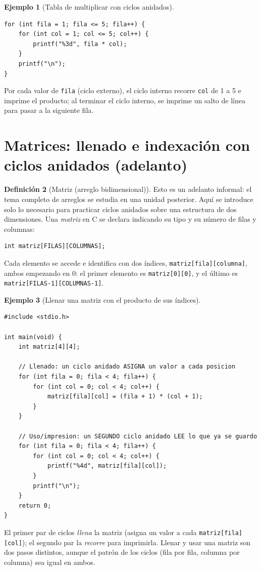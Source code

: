 \documentclass[11pt,letterpaper]{article}
\theoremstyle{definition}
\newtheorem{definicion}{Definición}[section]
\newtheorem{ejemplo}[definicion]{Ejemplo}
\begin{document}
\begin{ejemplo}[Tabla de multiplicar con ciclos anidados]
\begin{lstlisting}
for (int fila = 1; fila <= 5; fila++) {
    for (int col = 1; col <= 5; col++) {
        printf("%3d", fila * col);
    }
    printf("\n");
}
\end{lstlisting}
Por cada valor de \texttt{fila} (ciclo externo), el ciclo interno recorre \texttt{col} de 1 a 5 e
imprime el producto; al terminar el ciclo interno, se imprime un salto de línea para pasar a la
siguiente fila.
\end{ejemplo}

\section{Matrices: llenado e indexación con ciclos anidados (adelanto)}

\begin{definicion}[Matriz (arreglo bidimensional)]
Esto es un adelanto informal: el tema completo de arreglos se estudia en una unidad posterior. Aquí
se introduce solo lo necesario para practicar ciclos anidados sobre una estructura de dos
dimensiones. Una \emph{matriz} en C se declara indicando su tipo y su número de filas y columnas:
\begin{lstlisting}
int matriz[FILAS][COLUMNAS];
\end{lstlisting}
Cada elemento se accede e identifica con dos índices, \texttt{matriz[fila][columna]}, ambos
empezando en 0: el primer elemento es \texttt{matriz[0][0]}, y el último es
\texttt{matriz[FILAS-1][COLUMNAS-1]}.
\end{definicion}

\begin{ejemplo}[Llenar una matriz con el producto de sus índices]
\begin{lstlisting}
#include <stdio.h>

int main(void) {
    int matriz[4][4];

    // Llenado: un ciclo anidado ASIGNA un valor a cada posicion
    for (int fila = 0; fila < 4; fila++) {
        for (int col = 0; col < 4; col++) {
            matriz[fila][col] = (fila + 1) * (col + 1);
        }
    }

    // Uso/impresion: un SEGUNDO ciclo anidado LEE lo que ya se guardo
    for (int fila = 0; fila < 4; fila++) {
        for (int col = 0; col < 4; col++) {
            printf("%4d", matriz[fila][col]);
        }
        printf("\n");
    }
    return 0;
}
\end{lstlisting}
El primer par de ciclos \emph{llena} la matriz (asigna un valor a cada \texttt{matriz[fila][col]});
el segundo par la \emph{recorre} para imprimirla. Llenar y usar una matriz son dos pasos distintos,
aunque el patrón de los ciclos (fila por fila, columna por columna) sea igual en ambos.
\end{ejemplo}
\end{document}

